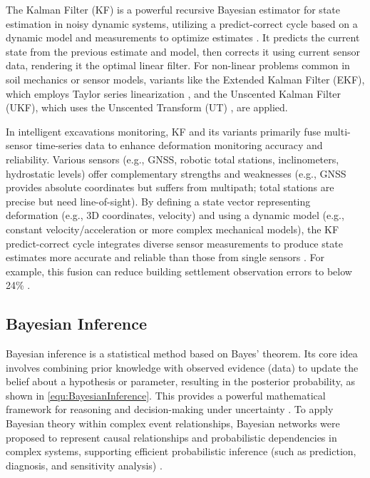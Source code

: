 \documentclass[preprint,11pt,authoryear,3p]{elsarticle}
\begin{document}
The Kalman Filter (KF) is a powerful recursive Bayesian estimator for state estimation in noisy dynamic systems, utilizing a predict-correct cycle based on a dynamic model and measurements to optimize estimates \citep{khodarahmi_review_2023}. It predicts the current state from the previous estimate and model, then corrects it using current sensor data, rendering it the optimal linear filter. For non-linear problems common in soil mechanics or sensor models, variants like the Extended Kalman Filter (EKF), which employs Taylor series linearization \citep{3662552,Gelb1974}, and the Unscented Kalman Filter (UKF), which uses the Unscented Transform (UT) \citep{Julier1997}, are applied.

In intelligent excavations monitoring, KF and its variants primarily fuse multi-sensor time-series data to enhance deformation monitoring accuracy and reliability. Various sensors (e.g., GNSS, robotic total stations, inclinometers, hydrostatic levels) offer complementary strengths and weaknesses (e.g., GNSS provides absolute coordinates but suffers from multipath; total stations are precise but need line-of-sight). By defining a state vector representing deformation (e.g., 3D coordinates, velocity) and using a dynamic model (e.g., constant velocity/acceleration or more complex mechanical models), the KF predict-correct cycle integrates diverse sensor measurements to produce state estimates more accurate and reliable than those from single sensors \citep{SMYTH2007706}. For example, this fusion can reduce building settlement observation errors to below 24\% \citep{zhang2021processing}.

\subsection{Bayesian Inference}

Bayesian inference is a statistical method based on Bayes' theorem. Its core idea involves combining prior knowledge with observed evidence (data) to update the belief about a hypothesis or parameter, resulting in the posterior probability, as shown in \autoref{equ:BayesianInference}. This provides a powerful mathematical framework for reasoning and decision-making under uncertainty \citep{Gelman2013}. To apply Bayesian theory within complex event relationships, Bayesian networks were proposed to represent causal relationships and probabilistic dependencies in complex systems, supporting efficient probabilistic inference (such as prediction, diagnosis, and sensitivity analysis) \citep{Jensen2007}.
\end{document}

